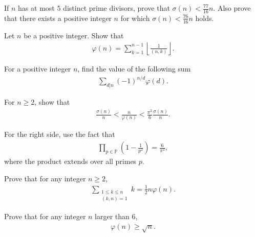 \documentclass[12pt]{subfile}
\begin{document}
	\begin{problem}
		If $n$ has at most $5$ distinct prime divisors, prove that $\sigma(n) < \frac{77}{16} n.$ Also prove that there exists a positive integer $n$ for which $\sigma(n) < \frac{76}{16} n$ holds.
	\end{problem}

	\begin{problem}
		Let $n$ be a positive integer. Show that
			\begin{align*}
				\varphi(n)=\sum_{k=1}^{n-1} \left\lfloor\frac{1}{(n,k)} \right\rfloor.
			\end{align*}
	\end{problem}


	\begin{problem}
		For a positive integer $n$, find the value of the following sum
			\begin{align*}
				\sum\limits_{d|n} (-1)^{n/d} \varphi(d).
			\end{align*}
	\end{problem}

	\begin{problem}
		For $n \geq 2$, show that
			\begin{align*}
				\frac{\sigma(n)}{n} < \frac{n}{\varphi(n)} < \frac{\pi^{2}}{6} \frac{\sigma(n)}{n}.
			\end{align*}
	\end{problem}

	\begin{hint}
		For the right side, use the fact that
			\begin{align*}
				\prod_{p \in \mathbb P} \left(1 - \frac{1}{p^2}\right) = \frac{6}{\pi^2},
			\end{align*}
		where the product extends over all primes $p$.
	\end{hint}
	\begin{problem}
		Prove that for any integer $n\geq 2$,
			\begin{align*}
				 \sum_{\substack{1 \leq k \leq n \\ (k,n)=1}} k = \frac{1}{2}n\varphi(n).
			\end{align*}
	\end{problem}

	\begin{problem}
		Prove that for any integer $n$ larger than $6$,
			\begin{align*}
				\varphi(n) \geq \sqrt n.
			\end{align*}
	\end{problem}
\end{document}
